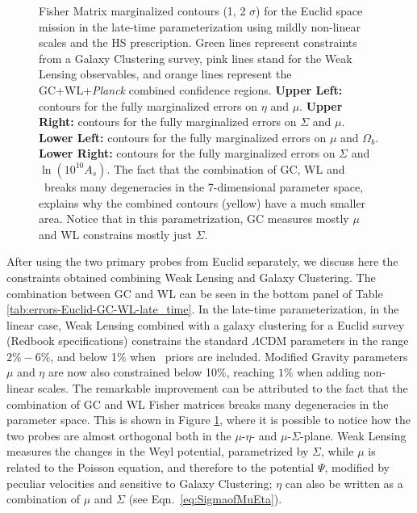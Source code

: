 \begin{figure}[htbp]
\begin{centering}
\end{centering}
\caption[Fisher confidence contours for a Euclid GC and WL forecast.]{\label{fig:DE+Planck-ellipses-mu-sig-eta} 
Fisher Matrix marginalized contours
(1, 2 $\sigma$) for the Euclid space mission in the late-time parameterization
using mildly non-linear scales and the HS prescription. Green lines
represent constraints from a Galaxy Clustering survey, pink lines
stand for the Weak Lensing observables, and orange lines represent the GC+WL+{\it Planck} combined confidence
regions. \textbf{Upper Left: }contours for the fully marginalized
errors on $\eta$ and $\mu$. \textbf{Upper Right: }contours for the
fully marginalized errors on $\Sigma$ and $\mu$.\textbf{ Lower Left:
}contours for the fully marginalized errors on $\mu$ and $\Omega_{b}$.
\textbf{Lower Right: }contours for the fully marginalized errors on
$\Sigma$ and $\ln(10^10 A_{s})$. The fact that the combination of GC, WL and \planck\
breaks many degeneracies in the 7-dimensional parameter space, explains why
the combined contours (yellow) have a much smaller area. Notice that in this parametrization, 
GC measures mostly $\mu$ and WL constrains mostly just $\Sigma$.}
\end{figure}

After using the two primary probes from Euclid
separately, we discuss here the constraints obtained combining Weak
Lensing and Galaxy Clustering. 
The combination between GC and
WL can be seen in the bottom panel of Table
\ref{tab:errors-Euclid-GC-WL-late_time}.
In the late-time parameterization, in the linear case, Weak Lensing combined with a galaxy
clustering for a Euclid survey (Redbook specifications) constrains the standard $\Lambda$CDM parameters
in the range $2 \% - 6 \%$, and below 1$\%$ when \planck\ priors are included. Modified Gravity parameters $\mu$ and $\eta$ are now also constrained below 10$\%$, reaching $1\%$ when adding non-linear scales.
The remarkable improvement can be attributed
to the fact that the combination of GC and WL Fisher matrices breaks
many degeneracies in the parameter space. This is shown in Figure
\ref{fig:DE+Planck-ellipses-mu-sig-eta}, where it is possible to notice
how the two probes are almost orthogonal both in the $\mu$-$\eta$-
and $\mu$-$\Sigma$-plane. Weak Lensing measures
the changes in the Weyl potential, parametrized by $\Sigma$, while $\mu$ is related to the Poisson equation, and therefore to the potential $\Psi$, modified by peculiar velocities and sensitive to Galaxy Clustering; $\eta$ can also be written as a combination of $\mu$ and $\Sigma$ (see Eqn.\ \ref{eq:SigmaofMuEta}). 

